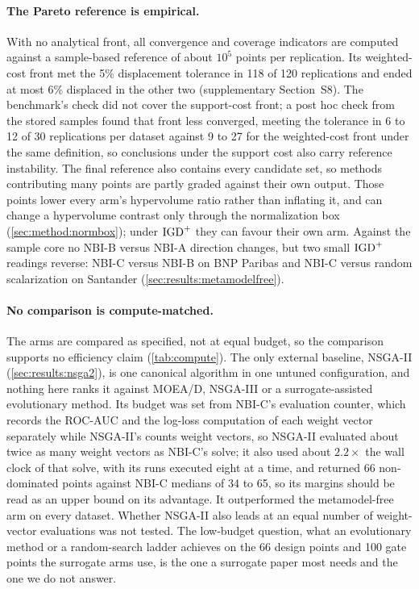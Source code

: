 \paragraph{The Pareto reference is empirical.} With no analytical front, all convergence and coverage indicators are
computed against a sample-based reference of about $10^{5}$ points per replication. Its weighted-cost front met the
5\% displacement tolerance in 118 of 120 replications and ended at most 6\% displaced in the other two
(supplementary Section~S8). The benchmark's check did not cover the support-cost front; a post hoc check from the
stored samples found that front less converged, meeting the tolerance in 6 to 12 of 30 replications per dataset
against 9 to 27 for the weighted-cost front under the same definition, so conclusions under the support cost also
carry reference instability. The final reference also
contains every candidate set, so methods contributing many points are partly graded against their own output. Those
points lower every arm's hypervolume ratio rather than inflating it, and can change a hypervolume contrast only
through the normalization box (\cref{sec:method:normbox}); under $\mathrm{IGD}^{+}$ they can favour their own arm. Against the
sample core no NBI-B versus NBI-A direction changes, but two small $\mathrm{IGD}^{+}$ readings reverse: NBI-C versus NBI-B on
BNP Paribas and NBI-C versus random scalarization on Santander (\cref{sec:results:metamodelfree}).

\paragraph{No comparison is compute-matched.} The arms are compared as specified, not at equal budget, so the
comparison supports no efficiency claim (\cref{tab:compute}). The only external baseline, NSGA-II
(\cref{sec:results:nsga2}), is one canonical algorithm in one untuned configuration, and nothing here ranks it against
MOEA/D, NSGA-III or a surrogate-assisted evolutionary method. Its budget was set from NBI-C's evaluation counter,
which records the ROC-AUC and the log-loss computation of each weight vector separately while NSGA-II's counts weight
vectors, so NSGA-II evaluated about twice as many weight vectors as NBI-C's solve; it also used about $2.2\times$ the
wall clock of that solve, with its runs executed eight at a time, and returned 66 non-dominated points against NBI-C
medians of 34 to 65, so its margins should be read as an upper bound on its advantage. It outperformed the metamodel-free arm on every dataset. Whether
NSGA-II also leads at an equal number of weight-vector evaluations was not tested. The low-budget question, what an
evolutionary method or a random-search ladder achieves on the 66 design points and 100 gate points the surrogate arms
use, is the one a surrogate paper most needs and the one we do not answer.


